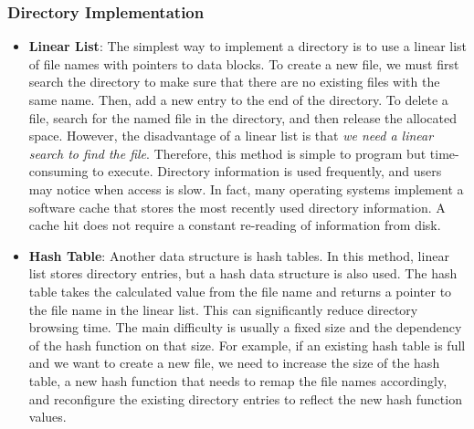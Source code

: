 \documentclass{homework}
\begin{document}
\subsubsection{Directory Implementation}
\begin{itemize}
    \item \textbf{Linear List}: The simplest way to implement a directory is to use a linear list of file names with pointers to data blocks. To create a new file, we must first search the directory to make sure that there are no existing files with the same name. Then, add a new entry to the end of the directory. To delete a file, search for the named file in the directory, and then release the allocated space. However, the disadvantage of a linear list is that \textit{we need a linear search to find the file}. Therefore, this method is simple to program but time-consuming to execute. Directory information is used frequently, and users may notice when access is slow. In fact, many operating systems implement a software cache that stores the most recently used directory information. A cache hit does not require a constant re-reading of information from disk.
    \item \textbf{Hash Table}: Another data structure is hash tables. In this method, linear list stores directory entries, but a hash data structure is also used. The hash table takes the calculated value from the file name and returns a pointer to the file name in the linear list. This can significantly reduce directory browsing time. The main difficulty is usually a fixed size and the dependency of the hash function on that size. For example, if an existing hash table is full and we want to create a new file, we need to increase the size of the hash table, a new hash function that needs to remap the file names accordingly, and reconfigure the existing directory entries to reflect the new hash function values.
\end{itemize}
\end{document}
